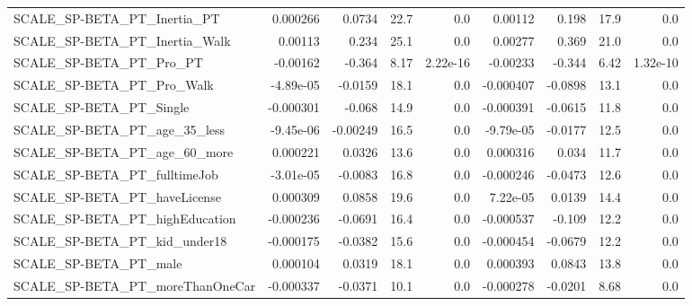 \begin{tabular}{lrrrrrrrr}
SCALE\_SP-BETA\_PT\_Inertia\_PT                        &    0.000266 &       0.0734 &     22.7 &      0.0 &    0.00112 &       0.198 &         17.9 &           0.0 \\
SCALE\_SP-BETA\_PT\_Inertia\_Walk                      &     0.00113 &        0.234 &     25.1 &      0.0 &    0.00277 &       0.369 &         21.0 &           0.0 \\
SCALE\_SP-BETA\_PT\_Pro\_PT                            &    -0.00162 &       -0.364 &     8.17 & 2.22e-16 &   -0.00233 &      -0.344 &         6.42 &      1.32e-10 \\
SCALE\_SP-BETA\_PT\_Pro\_Walk                          &   -4.89e-05 &      -0.0159 &     18.1 &      0.0 &  -0.000407 &     -0.0898 &         13.1 &           0.0 \\
SCALE\_SP-BETA\_PT\_Single                            &   -0.000301 &       -0.068 &     14.9 &      0.0 &  -0.000391 &     -0.0615 &         11.8 &           0.0 \\
SCALE\_SP-BETA\_PT\_age\_35\_less                       &   -9.45e-06 &     -0.00249 &     16.5 &      0.0 &  -9.79e-05 &     -0.0177 &         12.5 &           0.0 \\
SCALE\_SP-BETA\_PT\_age\_60\_more                       &    0.000221 &       0.0326 &     13.6 &      0.0 &   0.000316 &       0.034 &         11.7 &           0.0 \\
SCALE\_SP-BETA\_PT\_fulltimeJob                       &   -3.01e-05 &      -0.0083 &     16.8 &      0.0 &  -0.000246 &     -0.0473 &         12.6 &           0.0 \\
SCALE\_SP-BETA\_PT\_haveLicense                       &    0.000309 &       0.0858 &     19.6 &      0.0 &   7.22e-05 &      0.0139 &         14.4 &           0.0 \\
SCALE\_SP-BETA\_PT\_highEducation                     &   -0.000236 &      -0.0691 &     16.4 &      0.0 &  -0.000537 &      -0.109 &         12.2 &           0.0 \\
SCALE\_SP-BETA\_PT\_kid\_under18                       &   -0.000175 &      -0.0382 &     15.6 &      0.0 &  -0.000454 &     -0.0679 &         12.2 &           0.0 \\
SCALE\_SP-BETA\_PT\_male                              &    0.000104 &       0.0319 &     18.1 &      0.0 &   0.000393 &      0.0843 &         13.8 &           0.0 \\
SCALE\_SP-BETA\_PT\_moreThanOneCar                    &   -0.000337 &      -0.0371 &     10.1 &      0.0 &  -0.000278 &     -0.0201 &         8.68 &           0.0 \\

\end{tabular}
